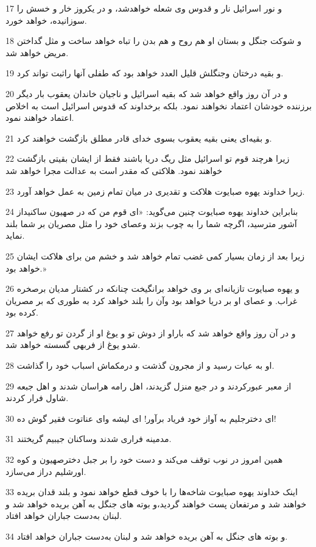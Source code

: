 \par 17 و نور اسرائیل نار و قدوس وی شعله خواهدشد، و در یکروز خار و خسش را سوزانیده، خواهد خورد.
\par 18 و شوکت جنگل و بستان او هم روح و هم بدن را تباه خواهد ساخت و مثل گداختن مریض خواهد شد.
\par 19 و بقیه درختان وجنگلش قلیل العدد خواهد بود که طفلی آنها راثبت تواند کرد.
\par 20 و در آن روز واقع خواهد شد که بقیه اسرائیل و ناجیان خاندان یعقوب بار دیگر برزننده خودشان اعتماد نخواهند نمود. بلکه برخداوند که قدوس اسرائیل است به اخلاص اعتماد خواهند نمود.
\par 21 و بقیه‌ای یعنی بقیه یعقوب بسوی خدای قادر مطلق بازگشت خواهند کرد.
\par 22 زیرا هرچند قوم تو اسرائیل مثل ریگ دریا باشند فقط از ایشان بقیتی بازگشت خواهند نمود. هلاکتی که مقدر است به عدالت مجرا خواهد شد
\par 23 زیرا خداوند یهوه صبایوت هلاکت و تقدیری در میان تمام زمین به عمل خواهد آورد.
\par 24 بنابراین خداوند یهوه صبایوت چنین می‌گوید: «ای قوم من که در صهیون ساکنیداز آشور مترسید، اگر‌چه شما را به چوب بزند وعصای خود را مثل مصریان بر شما بلند نماید.
\par 25 زیرا بعد از زمان بسیار کمی غضب تمام خواهد شد و خشم من برای هلاکت ایشان خواهد بود.»
\par 26 و یهوه صبایوت تازیانه‌ای بر وی خواهد برانگیخت چنانکه در کشتار مدیان برصخره غراب. و عصای او بر دریا خواهد بود وآن را بلند خواهد کرد به طوری که بر مصریان کرده بود.
\par 27 و در آن روز واقع خواهد شد که باراو از دوش تو و یوغ او از گردن تو رفع خواهد شدو یوغ از فربهی گسسته خواهد شد.
\par 28 او به عیات رسید و از مجرون گذشت و درمکماش اسباب خود را گذاشت.
\par 29 از معبر عبورکردند و در جبع منزل گزیدند، اهل رامه هراسان شدند و اهل جبعه شاول فرار کردند.
\par 30 ‌ای دخترجلیم به آواز خود فریاد برآور! ای لیشه و‌ای عناتوت فقیر گوش ده!
\par 31 مدمینه فراری شدند وساکنان جیبیم گریختند.
\par 32 همین امروز در نوب توقف می‌کند و دست خود را بر جبل دخترصهیون و کوه اورشلیم دراز می‌سازد.
\par 33 اینک خداوند یهوه صبایوت شاخه‌ها را با خوف قطع خواهد نمود و بلند قدان بریده خواهند شد و مرتفعان پست خواهند گردید،و بوته های جنگل به آهن بریده خواهد شد و لبنان به‌دست جباران خواهد افتاد.
\par 34 و بوته های جنگل به آهن بریده خواهد شد و لبنان به‌دست جباران خواهد افتاد.
 
